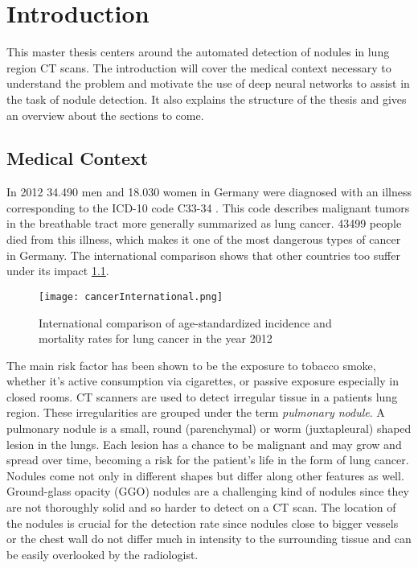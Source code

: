 \documentclass[main.tex]{subfiles}
\begin{document}
\chapter{Introduction}
This master thesis centers around the automated detection of nodules in lung region CT scans. The introduction will cover the medical context necessary to understand the problem and motivate the use of deep neural networks to assist in the task of nodule detection. It also explains the structure of the thesis and gives an overview about the sections to come.

\section{Medical Context}
In 2012 34.490 men and 18.030 women in Germany were diagnosed with an illness corresponding to the ICD-10 code C33-34 \cite{koch2015krebs}. This code describes malignant tumors in the breathable tract more generally summarized as lung cancer. 43499 people died from this illness, which makes it one of the most dangerous types of cancer in Germany. The international comparison shows that other countries too suffer under its impact \ref{fig:cancInt}.

\begin{figure}[ht]
\texttt{[image: cancerInternational.png]}
\caption{International comparison of age-standardized incidence and mortality rates for lung cancer in the year 2012}
\label{fig:cancInt}
\end{figure}

The main risk factor has been shown to be the exposure to tobacco smoke, whether it's active consumption via cigarettes, or passive exposure especially in closed rooms. CT scanners are used to detect irregular tissue in a patients lung region. These irregularities are grouped under the term \textit{pulmonary nodule}. A pulmonary nodule is a small, round (parenchymal) or worm (juxtapleural) shaped lesion in the lungs. Each lesion has a chance to be malignant and may grow and spread over time, becoming a risk for the patient's life in the form of lung cancer. Nodules come not only in different shapes but differ along other features as well. Ground-glass opacity (GGO) nodules are a challenging kind of nodules since they are not thoroughly solid and so harder to detect on a CT scan. The location of the nodules is crucial for the detection rate since nodules close to bigger vessels or the chest wall do not differ much in intensity to the surrounding tissue and can be easily overlooked by the radiologist.
\end{document}
